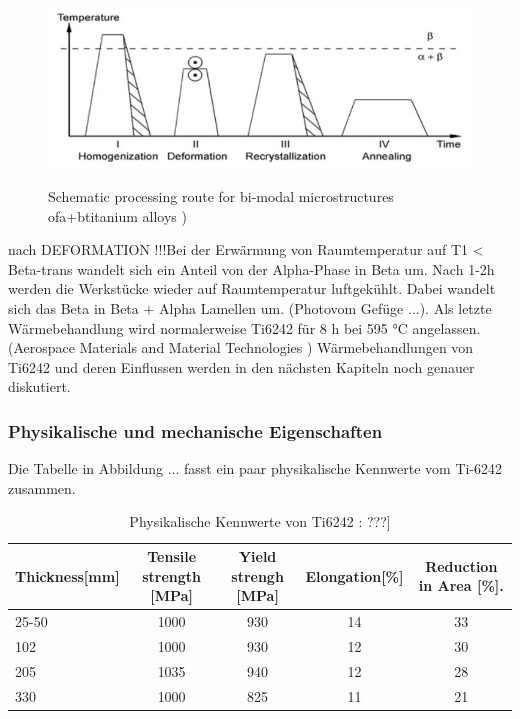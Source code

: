\begin{figure}[H]
	
	\centering
	
	{\includegraphics[width=1\textwidth]{Bilder/WB}}			
	\caption{Schematic processing route for bi-modal microstructures ofa+btitanium alloys )}
	\label{WB}
\end{figure}
nach DEFORMATION !!!Bei der Erwärmung von Raumtemperatur  auf T1 < Beta-trans wandelt sich ein Anteil von der Alpha-Phase in Beta um. Nach 1-2h werden die Werkstücke wieder auf Raumtemperatur luftgekühlt.
Dabei wandelt sich das Beta in Beta + Alpha Lamellen um. (Photovom Gefüge ...).
Als letzte Wärmebehandlung wird normalerweise  Ti6242 für  8 h  bei 595 °C angelassen. (Aerospace Materials and Material Technologies )
Wärmebehandlungen von Ti6242 und deren Einflussen werden in den nächsten Kapiteln noch genauer diskutiert.


\subsubsection{ Physikalische und mechanische Eigenschaften }

Die Tabelle in Abbildung ... fasst ein paar physikalische Kennwerte vom Ti-6242 zusammen.

\begin{table}[H]
	\centering	
	\begin{tabular}{|l |c |c|c |c|}
		\hline
		\centering
		Thickness[mm] & Tensile strength [MPa] & Yield strengh [MPa] & Elongation[\%]& Reduction in Area [\%]. \\
		\hline
		25-50&1000&930&14&33\\
		102&1000&930&12&30\\
		205&1035&940&12&28\\
		330&1000&825&11&21\\
		
		\hline
	\end{tabular}
	\caption{Physikalische Kennwerte von Ti6242 : ???]}
\end{table}


